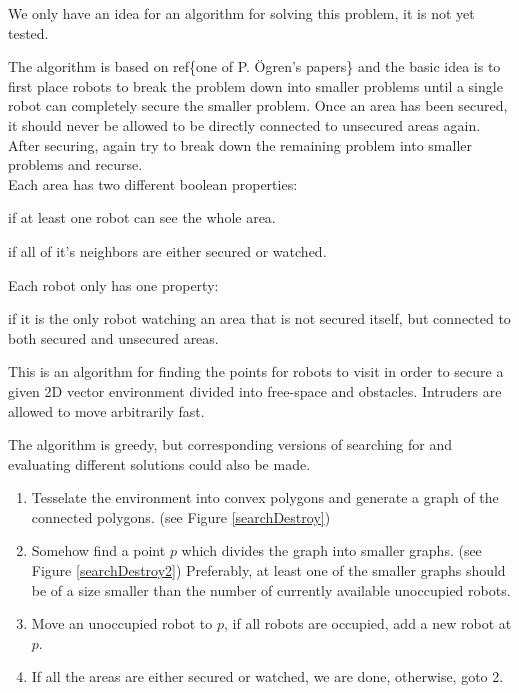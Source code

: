 We only have an idea for an algorithm for solving this problem, it is not yet tested.

The algorithm is based on ref\{one of P. Ögren's papers\} and the basic idea is to first place robots to break the problem down into smaller problems until a single robot can completely secure the smaller problem.
Once an area has been secured, it should never be allowed to be directly connected to unsecured areas again.
After securing, again try to break down the remaining problem into smaller problems and recurse.\\

Each area has two different boolean properties:
\begin{definition}[Watched]
if at least one robot can see the whole area.
\end{definition}
\begin{definition}[Secured]
if all of it's neighbors are either secured or watched.
\end{definition}

Each robot only has one property:
\begin{definition}[Occupied]
if it is the only robot watching an area that is not secured itself, but connected to both secured and unsecured areas.
\end{definition}

\begin{algorithm}
This is an algorithm for finding the points for robots to visit in order to secure a given 2D vector environment divided into free-space and obstacles. Intruders are allowed to move arbitrarily fast.

The algorithm is greedy, but corresponding versions of searching for and evaluating different solutions could also be made.
\begin{enumerate}
	\item Tesselate the environment into convex polygons and generate a graph of the connected polygons. (see Figure \ref{searchDestroy})
	\item Somehow find a point $p$ which divides the graph into smaller graphs. (see Figure \ref{searchDestroy2})
			Preferably, at least one of the smaller graphs should be of a size smaller than the number of currently available unoccupied robots.
	\item Move an unoccupied robot to $p$, if all robots are occupied, add a new robot at $p$.
	\item If all the areas are either secured or watched, we are done, otherwise, goto 2.
\end{enumerate}
\label{algSearchDestroyIdea}
\end{algorithm}


